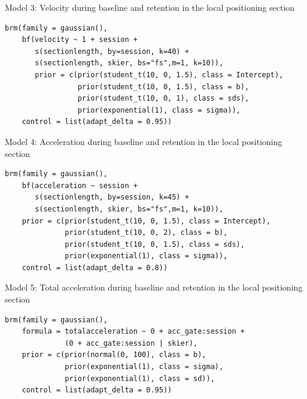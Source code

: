 \documentclass{article}
\begin{document}
Model 3: Velocity during baseline and retention in the local positioning section

\begin{verbatim}
brm(family = gaussian(),
    bf(velocity ~ 1 + session + 
       s(sectionlength, by=session, k=40) +
       s(sectionlength, skier, bs="fs",m=1, k=10)), 
       prior = c(prior(student_t(10, 0, 1.5), class = Intercept),
                 prior(student_t(10, 0, 1.5), class = b),
                 prior(student_t(10, 0, 1), class = sds),
                 prior(exponential(1), class = sigma)),
    control = list(adapt_delta = 0.95))
\end{verbatim}

Model 4: Acceleration during baseline and retention in the local positioning section

\begin{verbatim}
brm(family = gaussian(),
    bf(acceleration ~ session + 
       s(sectionlength, by=session, k=45) +
       s(sectionlength, skier, bs="fs",m=1, k=10)), 
    prior = c(prior(student_t(10, 0, 1.5), class = Intercept),
              prior(student_t(10, 0, 2), class = b),
              prior(student_t(10, 0, 1.5), class = sds),
              prior(exponential(1), class = sigma)),
    control = list(adapt_delta = 0.8))
\end{verbatim}

Model 5: Total acceleration during baseline and retention in the local positioning section

\begin{verbatim}
brm(family = gaussian(),
    formula = totalacceleration ~ 0 + acc_gate:session +
              (0 + acc_gate:session | skier),
    prior = c(prior(normal(0, 100), class = b),
              prior(exponential(1), class = sigma), 
              prior(exponential(1), class = sd)),
    control = list(adapt_delta = 0.95))
\end{verbatim}



\printbibliography %
\end{document}
